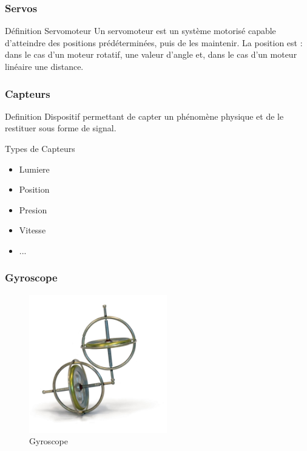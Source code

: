 \documentclass{beamer}
\begin{document}
\begin{frame}
  \frametitle{Servos}
  \begin{block}{Définition Servomoteur}
  Un servomoteur est un système motorisé capable d'atteindre des positions prédéterminées, puis de les maintenir. La position est : dans le cas d’un moteur rotatif, une valeur d'angle et, dans le cas d’un moteur linéaire une distance. 
  \end{block}
\end{frame}

\begin{frame}
  \frametitle{Capteurs}
  \begin{block}{Definition}
  Dispositif permettant de capter un phénomène physique et de le restituer sous forme de signal.
\end{block}
\begin{block}{Types de Capteurs}
  \begin{itemize}
      \item Lumiere
      \item Position
      \item Presion
      \item Vitesse
      \item ...
  \end{itemize}
\end{block}
\end{frame}

\begin{frame}
  \frametitle{Gyroscope}
  \begin{figure}[!h]
  \centering
  \includegraphics[width=6cm]{000066-twin-gyroscope-gallery-11.jpg}
  \caption{Gyroscope}
  \end{figure}
\end{frame}
\end{document}

